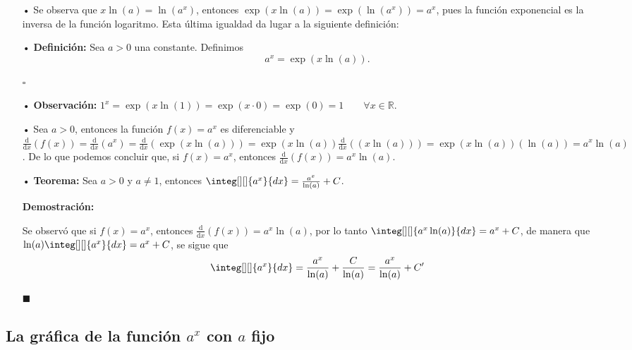 \documentclass[pts12]{article}
\numberwithin{equation}{section}
\newcommand{\Col}{\color{ProcessBlue}}
\newcommand{\derivate}[2]{\frac{\mathrm{d}}{\mathrm{d}#1} \left(  {#2}  \right)  }
\newcommand{\paratodoxen}[2]{\quad \forall {#1}\in\mathbb{#2}}
\begin{document}
\begin{itemize}
\item[\Col •] Se observa que $x\ln(a)=\ln(a^x)$, entonces $\exp(x\ln(a))=\exp(\ln(a^x))=a^x$, pues la función exponencial es la inversa de la función logaritmo. Esta última igualdad da lugar a la siguiente definición:

\item[\Col •] \textbf{Definición:} Sea $a>0$ una constante. Definimos 
$$a^x=\exp(x\ln(a)).$$

\begin{flushright}
$\square$
\end{flushright}

\item[\Col •] \textbf{Observación:} $1^x=\exp(x\ln(1))=\exp(x\cdot 0)=\exp(0)=1 \quad \paratodoxen{x}{R}$.
 
\item[\Col •] Sea $a>0$, entonces la función $f(x)=a^x$ es diferenciable y $\derivate{x}{f(x)}=\derivate{x}{a^x}=\derivate{x}{\exp(x\ln(a))}=\exp(x\ln(a))\derivate{x}{(x\ln(a))}=\exp(x\ln(a))(\ln(a))=a^x\ln(a)$. De lo que podemos concluir que, si $f(x)=a^x$, entonces $\derivate{x}{f(x)}=a^x\ln(a)$.

\item[\Col •] \textbf{Teorema:} Sea $a>0$ y $a\neq 1$, entonces $\integ[][]{a^x}{dx}=\frac{a^x}{\ln(a)}+C$.

\textbf{Demostración:}

Se observó que si $f(x)=a^x$, entonces $\derivate{x}{f(x)}=a^x\ln(a)$, por lo tanto $\integ[][]{a^x\ln(a)}{dx}=a^x+C$, de manera que $\ln(a)\integ[][]{a^x}{dx}=a^x+C$, se sigue que 
$$\integ[][]{a^x}{dx}=\frac{a^x}{\ln(a)}+\frac{C}{\ln(a)}=\frac{a^x}{\ln(a)}+C'$$  
 
\begin{flushright}
$\blacksquare$
\end{flushright} 
 
\end{itemize}

\subsection{\Col La gráfica de la función $a^x$ con $a$ fijo}
\end{document}
